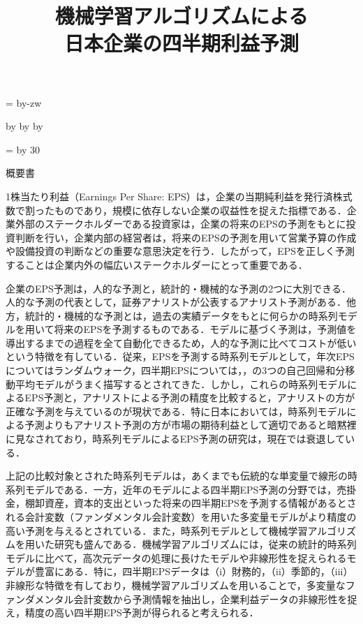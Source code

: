 \documentclass[a4paper，11pt]{jsarticle}
\title{機械学習アルゴリズムによる\\
  日本企業の四半期利益予測}
\date{}
\makeatletter
\def\mojiparline#1{
    \newcounter{mpl}
    \setcounter{mpl}{#1}
    \@tempdima=\linewidth
    \advance\@tempdima by-\value{mpl}zw
    \addtocounter{mpl}{-1}
    \divide\@tempdima by \value{mpl}
    \advance\kanjiskip by\@tempdima
    \advance\parindent by\@tempdima
}
\def\linesparpage#1{
    \baselineskip=\textheight
    \divide\baselineskip by #1
}
\makeatother
\begin{document}
\mojiparline{40}
\linesparpage{30}



\begin{center}
  {\large \sf 概要書}
\end{center}

1株当たり利益（Earnings Per Share: EPS）は，企業の当期純利益を発行済株式数で割ったものであり，規模に依存しない企業の収益性を捉えた指標である．企業外部のステークホルダーである投資家は，企業の将来のEPSの予測をもとに投資判断を行い，企業内部の経営者は，将来のEPSの予測を用いて営業予算の作成や設備投資の判断などの重要な意思決定を行う．したがって，EPSを正しく予測することは企業内外の幅広いステークホルダーにとって重要である．

企業のEPS予測は，人的な予測と，統計的・機械的な予測の2つに大別できる．人的な予測の代表として，証券アナリストが公表するアナリスト予測がある．他方，統計的・機械的な予測とは，過去の実績データをもとに何らかの時系列モデルを用いて将来のEPSを予測するものである．モデルに基づく予測は，予測値を導出するまでの過程を全て自動化できるため，人的な予測に比べてコストが低いという特徴を有している．従来，EPSを予測する時系列モデルとして，年次EPSについてはランダムウォーク，四半期EPSについては\cite*{brown1979univariate}，\cite{griffin1977time}，\cite{foster1977quarterly}の3つの自己回帰和分移動平均モデルがうまく描写するとされてきた．しかし，これらの時系列モデルによるEPS予測と，アナリストによる予測の精度を比較すると，アナリストの方が正確な予測を与えているのが現状である\citep{sakurai1990}．特に日本においては，時系列モデルによる予測よりもアナリスト予測の方が市場の期待利益として適切であると暗黙裡に見なされており，時系列モデルによるEPS予測の研究は，現在では衰退している\citep{ota2006}．

上記の比較対象とされた時系列モデルは，あくまでも伝統的な単変量で線形の時系列モデルである．一方，近年のモデルによる四半期EPS予測の分野では，売掛金，棚卸資産，資本的支出といった将来の四半期EPSを予測する情報があるとされる会計変数（ファンダメンタル会計変数）を用いた多変量モデルがより精度の高い予測を与えるとされている．また，時系列モデルとして機械学習アルゴリズムを用いた研究も盛んである．機械学習アルゴリズムには，従来の統計的時系列モデルに比べて，高次元データの処理に長けたモデルや非線形性を捉えられるモデルが豊富にある\citep*{cao2020fundamental}．特に，四半期EPSデータは（i）財務的，（ii）季節的，（iii）非線形な特徴を有しており\citep{hill1994artificial}，機械学習アルゴリズムを用いることで，多変量なファンダメンタル会計変数から予測情報を抽出し，企業利益データの非線形性を捉え，精度の高い四半期EPS予測が得られると考えられる．
\end{document}
